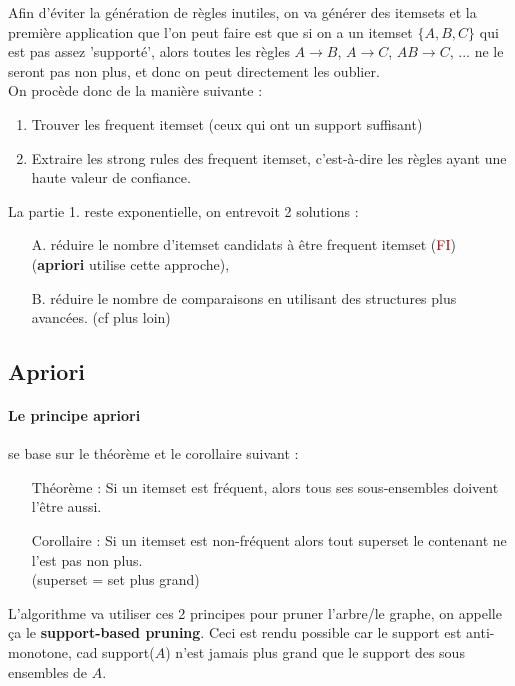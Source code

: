 \documentclass{article}
\newcommand{\rouge}[1]{\textcolor{darkred}{#1}}
\begin{document}
\begin{sffamily}
Afin d'éviter la génération de règles inutiles, on va générer des itemsets et la première application que l'on peut faire est que si on a 
un itemset $\{A,B,C\}$ qui est pas assez 'supporté', alors toutes les règles $A\rightarrow B$, $A\rightarrow C$, $AB\rightarrow C$, ... ne
le seront pas non plus, et donc on peut directement les oublier. \\
On procède donc de la manière suivante :
\begin{enumerate}
\item Trouver les frequent itemset (ceux qui ont un support suffisant)
\item Extraire les strong rules des frequent itemset, c'est-à-dire les règles ayant une haute valeur de confiance.
\end{enumerate}

La partie 1. reste exponentielle, on entrevoit 2 solutions :
\begin{enumerate}
\item[A.] réduire le nombre d'itemset candidats à être frequent itemset (\rouge{FI}) (\textbf{apriori} utilise cette approche),
\item[B.] réduire le nombre de comparaisons en utilisant des structures plus avancées. (cf plus loin)
\end{enumerate}

\subsection{Apriori}

\paragraph{Le principe apriori} se base sur le théorème et le corollaire suivant :
\begin{itemize}
\item[Théorème :] Si un itemset est fréquent, alors tous ses sous-ensembles doivent l'être aussi.
\item[Corollaire :] Si un itemset est non-fréquent alors tout superset le contenant ne l'est pas non plus.\\ (superset = set plus grand)
\end{itemize}
L'algorithme va utiliser ces 2 principes pour pruner l'arbre/le graphe, on appelle ça le \textbf{support-based pruning}. Ceci est rendu 
possible car le support est anti-monotone, cad support($A$) n'est jamais plus grand que le support des sous ensembles de $A$.


\end{sffamily}
\end{document}
